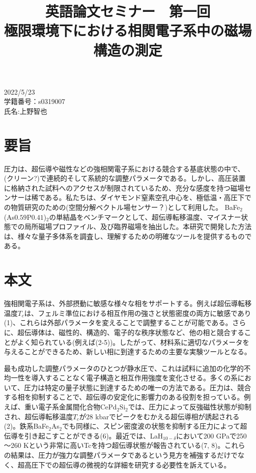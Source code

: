 \documentclass[dvipdfmx]{jsarticle}
\begin{document}
\title{\huge 英語論文セミナー　第一回\\極限環境下における相関電子系中の磁場構造の測定}
\date{}
\maketitle

\begin{flushright}
\Large
2022/5/23\\
学籍番号：s0319007\\
氏名:上野智也\\
\end{flushright}

\section{要旨}

圧力は、超伝導や磁性などの強相関電子系における競合する基底状態の中で、(クリーン?)で連続的そして系統的な調整パラメータである。しかし、高圧装置に格納された試料へのアクセスが制限されているため、充分な感度を持つ磁場センサーは稀である。私たちは、ダイヤモンド窒素空孔中心を、極低温・高圧下での物質研究のための(空間分解ベクトル場センサー？)として利用した。
BaFe$_2$(As$0.59$P$0.41$)$_2$の単結晶をベンチマークとして、超伝導転移温度、マイスナー状態での局所磁場プロファイル、及び臨界磁場を抽出した。本研究で開発した方法は、様々な量子多体系を調査し、理解するための明確なツールを提供するものである。

\section{本文}

強相関電子系は、外部摂動に敏感な様々な相をサポートする。例えば超伝導転移温度$T_c$は、フェルミ準位における相互作用の強さと状態密度の両方に敏感であり(1)、これらは外部パラメータを変えることで調整することが可能である。さらに、超伝導体は、磁性的、構造的、電子的な秩序状態など、他の相と競合することがよく知られている(例えば(2-5))。したがって、材料系に適切なパラメータを与えることができるため、新しい相に到達するための主要な実験ツールとなる。

最も成功した調整パラメータのひとつが静水圧で、これは試料に追加の化学的不均一性を導入することなく電子構造と相互作用強度を変化させる。多くの系において、圧力は特定の量子状態に到達するための唯一の方法である。圧力は、競合する相を抑制することで、超伝導の安定化に影響力のある役割を担っている。例えば、重い電子系金属間化合物CePd$_2$Si$_2$では、圧力によって反強磁性状態が抑制され、超伝導転移温度$T_c$が28 kbarでピークをむかえる超伝導相が誘起される(2)。鉄系BaFe$_2$As$_2$でも同様に、スピン密度波の状態を抑制する圧力によって超伝導を引き起こすことができる(6)。最近では、LaH$_{10-\delta}$において200 GPaで250～260 Kという非常に高いTcを持つ超伝導状態が報告されている(7, 8)。これらの結果は、圧力が強力な調整パラメータであるという見方を補強するだけでなく、超高圧下での超伝導の微視的な詳細を研究する必要性を訴えている。
\end{document}
